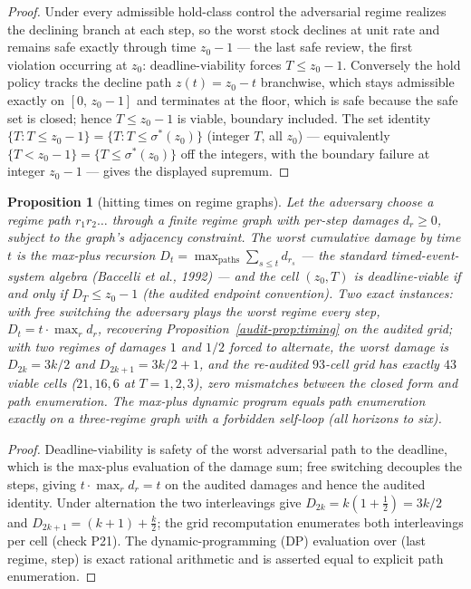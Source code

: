 \documentclass[10pt,twocolumn]{article}
\theoremstyle{plain}
\newtheorem{proposition}[theorem]{Proposition}
\theoremstyle{definition}
\theoremstyle{remark}
\begin{document}
\begin{proof}
Under every admissible hold-class control the adversarial regime realizes
the declining branch at each step, so the worst stock declines at unit
rate and remains safe exactly through time \(z_0 - 1\) --- the last
safe review, the first violation occurring at \(z_0\):
deadline-viability forces \(T \le z_0 - 1\). Conversely
the hold policy tracks the decline path \(z(t) = z_0 - t\) branchwise,
which stays admissible exactly on \([0,\, z_0 - 1]\) and terminates at
the floor, which is safe because the safe set is closed; hence
\(T \le z_0 - 1\) is viable, boundary included. The set identity
\(\{T : T \le z_0 - 1\} = \{T : T \le \sigma^{*}(z_0)\}\)
(integer \(T\), all \(z_0\)) --- equivalently \(\{T < z_0 - 1\} =
\{T \le \sigma^{*}(z_0)\}\) off the integers, with the boundary
failure at integer \(z_0 - 1\) --- gives the displayed supremum.
\end{proof}

\begin{proposition}[hitting times on regime graphs]\label{audit-prop:regime}
Let the adversary choose a regime path \(r_1 r_2 \dots\) through a
finite regime graph with per-step damages \(d_r \ge 0\), subject to
the graph's adjacency constraint. The worst cumulative damage by time
\(t\) is the max-plus recursion
\(D_t = \max_{\text{paths}} \sum_{s \le t} d_{r_s}\) --- the standard
timed-event-system algebra (Baccelli et al., 1992) --- and the cell
\((z_0, T)\) is deadline-viable if and only if \(D_T \le z_0 - 1\)
(the audited endpoint convention). Two exact instances: with free
switching the adversary plays the worst regime every step, \(D_t = t
\cdot \max_r d_r\), recovering Proposition~\ref{audit-prop:timing} on the
audited grid; with two regimes of damages \(1\) and \(1/2\) forced to
alternate, the worst damage is \(D_{2k} = 3k/2\) and \(D_{2k+1} = 3k/2
+ 1\), and the re-audited \(93\)-cell grid has exactly \(43\) viable
cells (\(21, 16, 6\) at \(T = 1, 2, 3\)), zero mismatches between the
closed form and path enumeration. The max-plus dynamic program equals
path enumeration exactly on a three-regime graph with a forbidden
self-loop (all horizons to six).
\end{proposition}

\begin{proof}
Deadline-viability is safety of the worst adversarial path to the
deadline, which is the max-plus evaluation of the damage sum; free
switching decouples the steps, giving \(t \cdot \max_r d_r = t\) on
the audited damages and hence the audited identity. Under alternation
the two interleavings give \(D_{2k} = k(1 + \tfrac12) = 3k/2\) and
\(D_{2k+1} = (k+1) + \tfrac{k}{2}\); the grid recomputation enumerates
both interleavings per cell (check P21). The dynamic-programming (DP) evaluation over
(last regime, step) is exact rational arithmetic and is asserted equal
to explicit path enumeration.
\end{proof}
\end{document}

